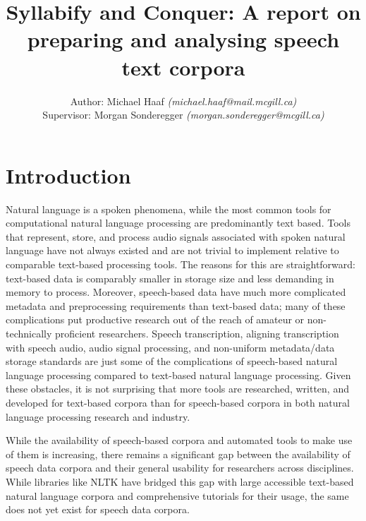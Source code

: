 \documentclass[11pt]{article}
\begin{document}
\title{Syllabify and Conquer: A report on preparing and analysing speech text corpora}
\author{Author: Michael Haaf \textit{(michael.haaf@mail.mcgill.ca)} \\ Supervisor: Morgan Sonderegger \textit{(morgan.sonderegger@mcgill.ca)}}

\maketitle
\begin{singlespace}
\tableofcontents
\end{singlespace}
\newpage

\section{Introduction}

Natural language is a spoken phenomena, while the most common tools for computational natural language processing are predominantly text based. Tools that represent, store, and process audio signals associated with spoken natural language have not always existed and are not trivial to implement relative to comparable text-based processing tools. The reasons for this are straightforward: text-based data is comparably smaller in storage size and less demanding in memory to process. Moreover, speech-based data have much more complicated metadata and preprocessing requirements than text-based data; many of these complications put productive research out of the reach of amateur or non-technically proficient researchers. Speech transcription, aligning transcription with speech audio, audio signal processing, and non-uniform metadata/data storage standards are just some of the complications of speech-based natural language processing compared to text-based natural language processing. Given these obstacles, it is not surprising that more tools are researched, written, and developed for text-based corpora than for speech-based corpora in both natural language processing research and industry.

While the availability of speech-based corpora and automated tools to make use of them is increasing\cite{mcauliffe_polyglot_2017}, there remains a significant gap between the availability of speech data corpora and their general usability for researchers across disciplines. While libraries like NLTK\cite{noauthor_nltk_nodate} have bridged this gap with large accessible text-based natural language corpora and comprehensive tutorials for their usage, the same does not yet exist for speech data corpora.
\end{document}
